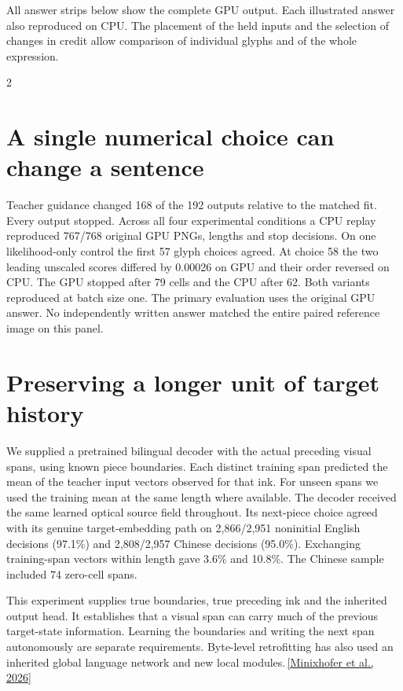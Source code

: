 \newpage
{}
\noindent All answer strips below show the complete GPU output. Each illustrated answer also reproduced on CPU. The placement of the held inputs and the selection of changes in credit allow comparison of individual glyphs and of the whole expression.
\begin{multicols}{2}
\section*{A single numerical choice can change a sentence}
Teacher guidance changed 168 of the 192 outputs relative to the matched fit. Every output stopped. Across all four experimental conditions a CPU replay reproduced 767/768 original GPU PNGs, lengths and stop decisions. On one likelihood-only control the first 57 glyph choices agreed. At choice 58 the two leading unscaled scores differed by 0.00026 on GPU and their order reversed on CPU. The GPU stopped after 79 cells and the CPU after 62. Both variants reproduced at batch size one. The primary evaluation uses the original GPU answer. No independently written answer matched the entire paired reference image on this panel.
\section*{Preserving a longer unit of target history}
We supplied a pretrained bilingual decoder with the actual preceding visual spans, using known piece boundaries. Each distinct training span predicted the mean of the teacher input vectors observed for that ink. For unseen spans we used the training mean at the same length where available. The decoder received the same learned optical source field throughout. Its next-piece choice agreed with its genuine target-embedding path on 2,866/2,951 noninitial English decisions (97.1\%) and 2,808/2,957 Chinese decisions (95.0\%). Exchanging training-span vectors within length gave 3.6\% and 10.8\%. The Chinese sample included 74 zero-cell spans.
\par This experiment supplies true boundaries, true preceding ink and the inherited output head. It establishes that a visual span can carry much of the previous target-state information. Learning the boundaries and writing the next span autonomously are separate requirements. Byte-level retrofitting has also used an inherited global language network and new local modules.\,\href{https://doi.org/10.1038/s41586-026-11111-4}{[Minixhofer et al., 2026]}
\end{multicols}

